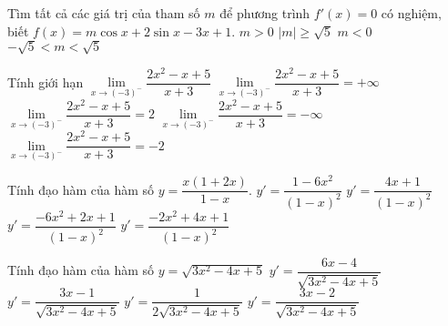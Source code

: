 \begin{ex}%
	Tìm tất cả các giá trị của tham số $m$ để phương trình $f'(x)=0$ có nghiệm, biết $f(x)=m\cos x+2\sin x-3x+1$.
	\choice
	{$m>0$}
	{\True $\big|m\big|\geqslant \sqrt{5}$}
	{$m<0$}
	{$-\sqrt{5}<m<\sqrt{5}$}
\end{ex}
\begin{ex}%
	Tính giới hạn $\lim\limits_{x\to (-3)^-} \dfrac{2x^2-x+5}{x+3}$
	\choice
	{$\lim\limits_{x\to (-3)^-} \dfrac{2x^2-x+5}{x+3}=+\infty $}
	{$\lim\limits_{x\to (-3)^-} \dfrac{2x^2-x+5}{x+3}=2$}
	{\True $\lim\limits_{x\to (-3)^-} \dfrac{2x^2-x+5}{x+3}=-\infty $}
	{$\lim\limits_{x\to (-3)^-} \dfrac{2x^2-x+5}{x+3}=-2$}
\end{ex}
\begin{ex}%
	Tính đạo hàm của hàm số $y=\dfrac{x(1+2x)}{1-x}.$
	\choice
	{$y'=\dfrac{1-6x^2}{(1-x)^2}$}
	{$y'=\dfrac{4x+1}{(1-x)^2}$}
	{$y'=\dfrac{-6x^2+2x+1}{(1-x)^2}$}
	{\True $y'=\dfrac{-2x^2+4x+1}{(1-x)^2}$}
\end{ex}
\begin{ex}%
	Tính đạo hàm của hàm số $y=\sqrt{3x^2-4x+5}$
	\choice
	{$y'=\dfrac{6x-4}{\sqrt{3x^2-4x+5}}$}
	{$y'=\dfrac{3x-1}{\sqrt{3x^2-4x+5}}$}
	{$y'=\dfrac{1}{2\sqrt{3x^2-4x+5}}$}
	{\True $y'=\dfrac{3x-2}{\sqrt{3x^2-4x+5}}$}
\end{ex}
